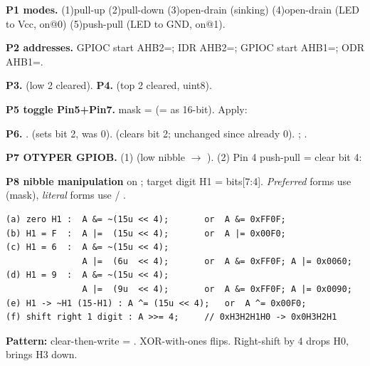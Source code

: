 \begin{hwp}\textbf{P1 modes.} (1)pull-up (2)pull-down (3)open-drain (sinking) (4)open-drain (LED to Vcc, on@0) (5)push-pull (LED to GND, on@1).\end{hwp}

\begin{hwp}\textbf{P2 addresses.} GPIOC start AHB2=; IDR AHB2=; GPIOC start AHB1=; ODR AHB1=.\end{hwp}

\begin{hwp}\textbf{P3.}  (low 2 cleared). \textbf{P4.}  (top 2 cleared, uint8).\end{hwp}

\begin{hwp}\textbf{P5 toggle Pin5+Pin7.} mask =  (=  as 16-bit). Apply: \end{hwp}

\begin{hwp}\textbf{P6.} .  (sets bit 2, was 0).  (clears bit 2; unchanged since already 0). ; .\end{hwp}

\begin{hwp}\textbf{P7 OTYPER GPIOB.} (1)  (low nibble  $\to$ ). (2) Pin 4 push-pull = clear bit 4: \end{hwp}

\begin{hwp}\textbf{P8 nibble manipulation} on ; target digit H1 = bits[7:4]. \emph{Preferred} forms use  (mask), \emph{literal} forms use  / .
\begin{lstlisting}[language={}]
(a) zero H1 :  A &= ~(15u << 4);       or  A &= 0xFF0F;
(b) H1 = F  :  A |=  (15u << 4);       or  A |= 0x00F0;
(c) H1 = 6  :  A &= ~(15u << 4);
               A |=  (6u  << 4);       or  A &= 0xFF0F; A |= 0x0060;
(d) H1 = 9  :  A &= ~(15u << 4);
               A |=  (9u  << 4);       or  A &= 0xFF0F; A |= 0x0090;
(e) H1 -> ~H1 (15-H1) : A ^= (15u << 4);   or  A ^= 0x00F0;
(f) shift right 1 digit : A >>= 4;     // 0xH3H2H1H0 -> 0x0H3H2H1
\end{lstlisting}
\textbf{Pattern:} clear-then-write = . XOR-with-ones flips. Right-shift by 4 drops H0, brings H3 down.\end{hwp}

